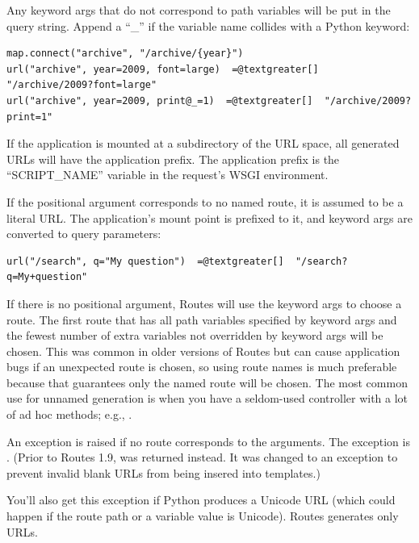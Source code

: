 \documentclass[letterpaper,10pt,english]{manual}
\begin{document}
Any keyword args that do not correspond to path variables will be put in the
query string.  Append a ``\_'' if the variable name collides with a Python
keyword:

\begin{Verbatim}[commandchars=@\[\]]
map.connect("archive", "/archive/{year}")
url("archive", year=2009, font=large)  =@textgreater[]  "/archive/2009?font=large"
url("archive", year=2009, print@_=1)  =@textgreater[]  "/archive/2009?print=1"
\end{Verbatim}

If the application is mounted at a subdirectory of the URL space,
all generated URLs will have the application prefix.  The application prefix is
the ``SCRIPT\_NAME'' variable in the request's WSGI environment.

If the positional argument corresponds to no named route, it is assumed to be a
literal URL.  The application's mount point is prefixed to it, and keyword args
are converted to query parameters:

\begin{Verbatim}[commandchars=@\[\]]
url("/search", q="My question")  =@textgreater[]  "/search?q=My+question"
\end{Verbatim}

If there is no positional argument, Routes will use the keyword args to choose
a route.  The first route that has all path variables specified by keyword args
and the fewest number of extra variables not overridden by keyword args will be
chosen.  This was common in older versions of Routes but can cause application
bugs if an unexpected route is chosen, so using route names is much preferable
because that guarantees only the named route will be chosen.  The most common
use for unnamed generation is when you have a seldom-used controller with a lot
of ad hoc methods; e.g., .

An exception is raised if no route corresponds to the arguments.  The exception
is .  (Prior to Routes 1.9,  was
returned instead.  It was changed to an exception to prevent invalid blank URLs
from being insered into templates.)

You'll also get this exception if Python produces a Unicode URL (which could
happen if the route path or a variable value is Unicode).  Routes generates
only  URLs.
\end{document}
